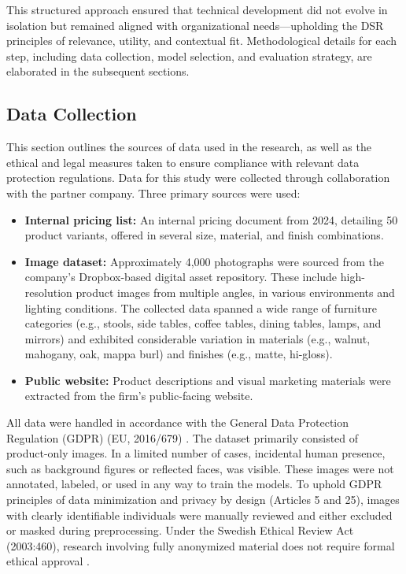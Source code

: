 \documentclass[a4paper,10pt,twocolumn]{article}
\numberwithin{figure}{section}
\numberwithin{table}{section}
\begin{document}
This structured approach ensured that technical development did not 
evolve in isolation but remained aligned with organizational needs—upholding 
the DSR principles of relevance, utility, and contextual fit. 
Methodological details for each step, including data collection, 
model selection, and evaluation strategy, are elaborated in the subsequent sections.

\subsection{Data Collection}

This section outlines the sources of data used 
in the research, as well as the ethical and legal 
measures taken to ensure compliance with relevant 
data protection regulations.
Data for this study were collected through 
collaboration with the partner company. 
Three primary sources were used:

\begin{itemize}
    \item \textbf{Internal pricing list:} An internal pricing document from 2024, detailing 50 product variants, offered in several size, material, and finish combinations.
    \item \textbf{Image dataset:} Approximately 4,000 photographs were sourced from the company's Dropbox-based digital asset repository. These include high-resolution product images from multiple angles, in various environments and lighting conditions. 
    The collected data spanned a wide range of furniture categories (e.g., stools, side tables, coffee tables, dining tables, 
    lamps, and mirrors) and exhibited considerable variation in materials (e.g., walnut, mahogany, oak, mappa burl) and finishes (e.g., matte, hi-gloss). 

    \item \textbf{Public website:} Product descriptions and visual marketing materials were extracted from the firm’s public-facing website.
\end{itemize}


All data were handled in accordance with the General Data Protection Regulation (GDPR) (EU, 2016/679) \citep{gdpr}. 
The dataset primarily consisted of product-only images. In a limited number of 
cases, incidental human presence, such as background figures or reflected faces, was visible. 
These images were not annotated, labeled, or used in any way to train the models.
To uphold GDPR principles of data minimization and privacy by design (Articles 5 and 25), 
images with clearly identifiable individuals were manually reviewed and either excluded 
or masked during preprocessing. Under the Swedish Ethical Review Act (2003:460), 
research involving fully anonymized material does not require formal 
ethical approval \citep{etik}.
\end{document}
